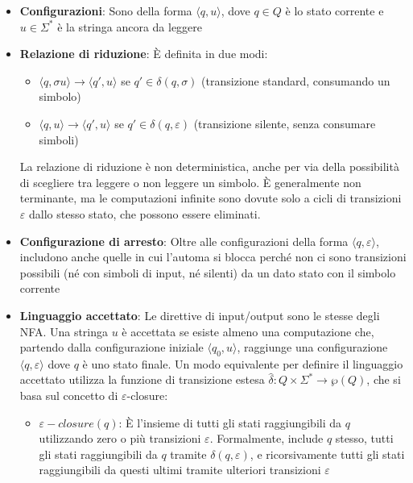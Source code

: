 \documentclass[12pt, a4paper]{report}
\begin{document}
                \begin{itemize}
                    \item \textbf{Configurazioni}: Sono della forma $\langle q, u \rangle$, dove $q \in Q$ è lo stato corrente e $u \in \Sigma^*$ è la stringa ancora da leggere
                    \item \textbf{Relazione di riduzione}: È definita in due modi: \begin{itemize}
                        \item $\langle q, \sigma u \rangle \to \langle q', u \rangle$ se $q' \in \delta(q, \sigma)$ (transizione standard, consumando un simbolo)
                        \item $\langle q, u \rangle \to \langle q', u \rangle$ se $q' \in \delta(q, \varepsilon)$ (transizione silente, senza consumare simboli)
                    \end{itemize}
                    La relazione di riduzione è non deterministica, anche per via della possibilità di scegliere tra leggere o non leggere un simbolo. È generalmente non terminante, ma le computazioni infinite sono dovute solo a cicli di transizioni $\varepsilon$ dallo stesso stato, che possono essere eliminati.
                    \item \textbf{Configurazione di arresto}: Oltre alle configurazioni della forma $\langle q, \varepsilon \rangle$, includono anche quelle in cui l'automa si blocca perché non ci sono transizioni possibili (né con simboli di input, né silenti) da un dato stato con il simbolo corrente
                    \item \textbf{Linguaggio accettato}: Le direttive di input/output sono le stesse degli NFA. Una stringa $u$ è accettata se esiste almeno una computazione che, partendo dalla configurazione iniziale $\langle q_0, u \rangle$, raggiunge una configurazione $\langle q, \varepsilon \rangle$ dove $q$ è uno stato finale. Un modo equivalente per definire il linguaggio accettato utilizza la funzione di transizione estesa $\hat{\delta} : Q \times \Sigma^* \to \wp(Q)$, che si basa sul concetto di $\varepsilon$-closure: \begin{itemize}
                        \item \textbf{$\varepsilon-closure(q)$}: È l'insieme di tutti gli stati raggiungibili da $q$ utilizzando zero o più transizioni $\varepsilon$. Formalmente, include $q$ stesso, tutti gli stati raggiungibili da $q$ tramite $\delta(q, \varepsilon)$, e ricorsivamente tutti gli stati raggiungibili da questi ultimi tramite ulteriori transizioni $\varepsilon$

\end{itemize}
\end{itemize}
\end{document}
